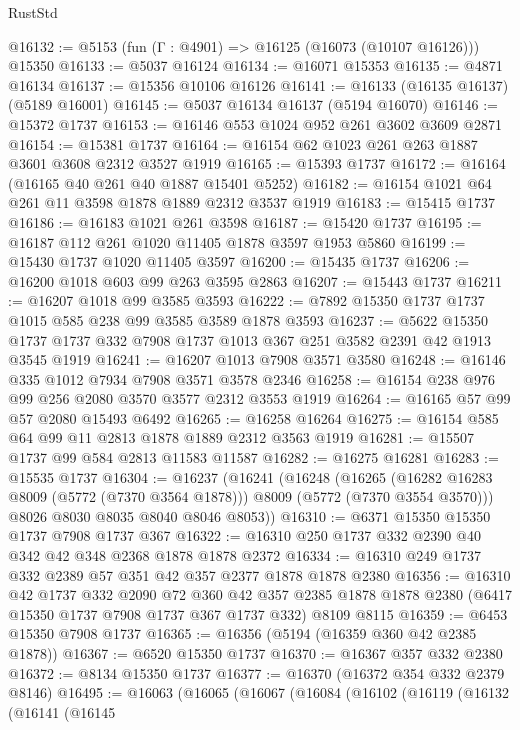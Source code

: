 \begin{lexlean}{RustStd}
\begin{coremodule}
{\begin{coremodule}
{{{{{{{{{{{{{{{{{{{{{{{{{{{{{@16132 := @5153 (fun (Γ : @4901) => @16125 (@16073 (@10107 @16126))) @15350
@16133 := @5037 @16124
@16134 := @16071 @15353
@16135 := @4871 @16134
@16137 := @15356 @10106 @16126
@16141 := @16133 (@16135 @16137) (@5189 @16001)
@16145 := @5037 @16134 @16137 (@5194 @16070)
@16146 := @15372 @1737
@16153 := @16146 @553 @1024 @952 @261 @3602 @3609 @2871
@16154 := @15381 @1737
@16164 := @16154 @62 @1023 @261 @263 @1887 @3601 @3608 @2312 @3527 @1919
@16165 := @15393 @1737
@16172 := @16164 (@16165 @40 @261 @40 @1887 @15401 @5252)
@16182 := @16154 @1021 @64 @261 @11 @3598 @1878 @1889 @2312 @3537 @1919
@16183 := @15415 @1737
@16186 := @16183 @1021 @261 @3598
@16187 := @15420 @1737
@16195 := @16187 @112 @261 @1020 @11405 @1878 @3597 @1953 @5860
@16199 := @15430 @1737 @1020 @11405 @3597
@16200 := @15435 @1737
@16206 := @16200 @1018 @603 @99 @263 @3595 @2863
@16207 := @15443 @1737
@16211 := @16207 @1018 @99 @3585 @3593
@16222 := @7892 @15350 @1737 @1737 @1015 @585 @238 @99 @3585 @3589 @1878 @3593
@16237 := @5622
    @15350
    @1737
    @1737
    @332
    @7908
    @1737
    @1013
    @367
    @251
    @3582
    @2391
    @42
    @1913
    @3545
    @1919
@16241 := @16207 @1013 @7908 @3571 @3580
@16248 := @16146 @335 @1012 @7934 @7908 @3571 @3578 @2346
@16258 := @16154 @238 @976 @99 @256 @2080 @3570 @3577 @2312 @3553 @1919
@16264 := @16165 @57 @99 @57 @2080 @15493 @6492
@16265 := @16258 @16264
@16275 := @16154 @585 @64 @99 @11 @2813 @1878 @1889 @2312 @3563 @1919
@16281 := @15507 @1737 @99 @584 @2813 @11583 @11587
@16282 := @16275 @16281
@16283 := @15535 @1737
@16304 := @16237
    (@16241
      (@16248
        (@16265 (@16282 @16283 @8009 (@5772 (@7370 @3564 @1878))) @8009 (@5772 (@7370 @3554 @3570)))
        @8026
        @8030
        @8035
        @8040
        @8046
        @8053))
@16310 := @6371 @15350 @15350 @1737 @7908 @1737 @367
@16322 := @16310 @250 @1737 @332 @2390 @40 @342 @42 @348 @2368 @1878 @1878 @2372
@16334 := @16310 @249 @1737 @332 @2389 @57 @351 @42 @357 @2377 @1878 @1878 @2380
@16356 := @16310
    @42
    @1737
    @332
    @2090
    @72
    @360
    @42
    @357
    @2385
    @1878
    @1878
    @2380
    (@6417 @15350 @1737 @7908 @1737 @367 @1737 @332)
    @8109
    @8115
@16359 := @6453 @15350 @7908 @1737
@16365 := @16356 (@5194 (@16359 @360 @42 @2385 @1878))
@16367 := @6520 @15350 @1737
@16370 := @16367 @357 @332 @2380
@16372 := @8134 @15350 @1737
@16377 := @16370 (@16372 @354 @332 @2379 @8146)
@16495 := @16063
    (@16065
      (@16067
        (@16084
          (@16102
            (@16119
              (@16132
                (@16141
                  (@16145
}}}}}}}}}}}}}}}}}}}}}}}}}}}}}
\end{coremodule}}
\end{coremodule}
\end{lexlean}
